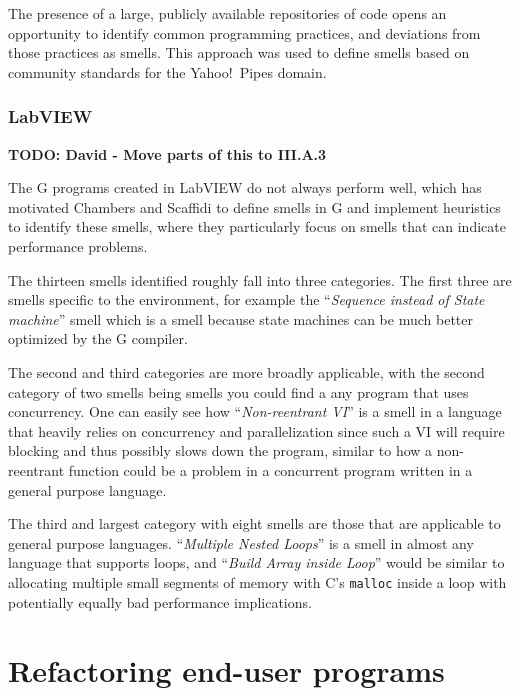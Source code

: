 \documentclass[10pt,conference,compsocconf]{IEEEtran}
\newcommand{\todo}[1]{\textbf{TODO: #1}}
\begin{document}
The presence of a large, publicly available repositories of code opens an opportunity to identify common programming practices, and deviations from those practices as smells. This approach was used to define smells based on community standards for the Yahoo!\ Pipes domain. 



\subsubsection{LabVIEW}

\todo{David - Move parts of this to III.A.3}

The G programs created in LabVIEW do not always perform well, which has motivated Chambers and Scaffidi \cite{chambers2013smell} to define smells in G and implement heuristics to identify these smells, where they particularly focus on smells that can indicate performance problems.

The thirteen smells identified roughly fall into three categories.
The first three are smells specific to the environment, for example the ``\textit{Sequence instead of State machine}'' smell which is a smell because state machines can be much better optimized by the G compiler.

The second and third categories are more broadly applicable, with the second category of two smells being smells you could find a any program that uses concurrency.
One can easily see how ``\textit{Non-reentrant VI}'' is a smell in a language that heavily relies on concurrency and parallelization since such a VI will require blocking and thus possibly slows down the program, similar to how a non-reentrant function could be a problem in a concurrent program written in a general purpose language.

The third and largest category with eight smells are those that are applicable to general purpose languages.
``\textit{Multiple Nested Loops}'' is a smell in almost any language that supports loops, and ``\textit{Build Array inside Loop}'' would be similar to allocating multiple small segments of memory with C's \texttt{malloc} inside a loop with potentially equally bad performance implications.


\section{Refactoring end-user programs}
\label{sec:refactoring}
\end{document}
